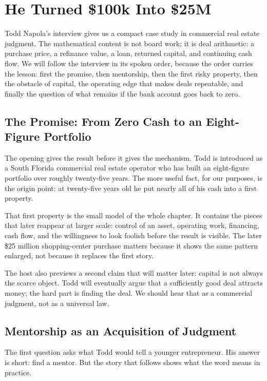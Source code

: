 \chapter{He Turned \$100k Into \$25M}

Todd Napola's interview gives us a compact case study in commercial real estate judgment. The mathematical content is not board work; it is deal arithmetic: a purchase price, a refinance value, a loan, returned capital, and continuing cash flow. We will follow the interview in its spoken order, because the order carries the lesson: first the promise, then mentorship, then the first risky property, then the obstacle of capital, the operating edge that makes deals repeatable, and finally the question of what remains if the bank account goes back to zero.

\section{The Promise: From Zero Cash to an Eight-Figure Portfolio}

The opening gives the result before it gives the mechanism. Todd is introduced as a South Florida commercial real estate operator who has built an eight-figure portfolio over roughly twenty-five years. The more useful fact, for our purposes, is the origin point: at twenty-five years old he put nearly all of his cash into a first property.

That first property is the small model of the whole chapter. It contains the pieces that later reappear at larger scale: control of an asset, operating work, financing, cash flow, and the willingness to look foolish before the result is visible. The later \$25 million shopping-center purchase matters because it shows the same pattern enlarged, not because it replaces the first story.

The host also previews a second claim that will matter later: capital is not always the scarce object. Todd will eventually argue that a sufficiently good deal attracts money; the hard part is finding the deal. We should hear that as a commercial judgment, not as a universal law.

\section{Mentorship as an Acquisition of Judgment}

The first question asks what Todd would tell a younger entrepreneur. His answer is short: find a mentor. But the story that follows shows what the word means in practice.

